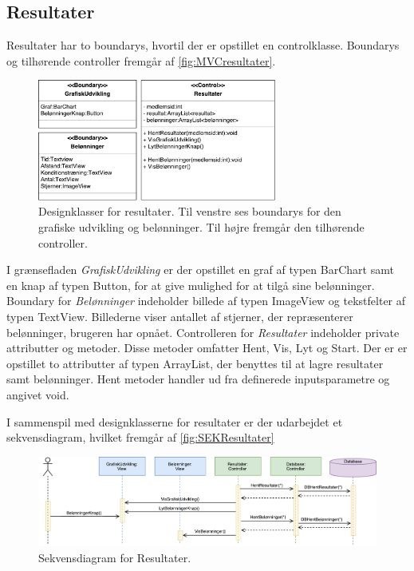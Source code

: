 \subsection*{Resultater}
Resultater har to boundarys, hvortil der er opstillet en controlklasse. Boundarys og tilhørende controller fremgår af \autoref{fig:MVCresultater}. 

\begin{figure} [H]
\centering
\includegraphics[width=0.7\textwidth]{figures/MVC/MVCResultater}
\caption{Designklasser for resultater. Til venstre ses boundarys for den grafiske udvikling og belønninger. Til højre fremgår den tilhørende controller.}
\label{fig:MVCresultater}
\end{figure}

\noindent
I grænsefladen \textit{GrafiskUdvikling} er der opstillet en graf af typen BarChart samt en knap af typen Button, for at give mulighed for at tilgå sine belønninger. Boundary for \textit{Belønninger} indeholder billede af typen ImageView og tekstfelter af typen TextView. Billederne viser antallet af stjerner, der repræsenterer belønninger, brugeren har opnået.
Controlleren for \textit{Resultater} indeholder private attributter og metoder. Disse metoder omfatter Hent, Vis, Lyt og Start. Der er er opstillet to attributter af typen ArrayList, der benyttes til at lagre resultater samt belønninger. Hent metoder handler ud fra definerede inputsparametre og angivet void. 

I sammenspil med designklasserne for resultater er der udarbejdet et sekvensdiagram, hvilket fremgår af \autoref{fig:SEKResultater}

\begin{figure} [H]
\centering
\includegraphics[width=1\textwidth]{figures/Sek/SEKResultater}
\caption{Sekvensdiagram for Resultater.}
\label{fig:SEKResultater}
\end{figure} 

